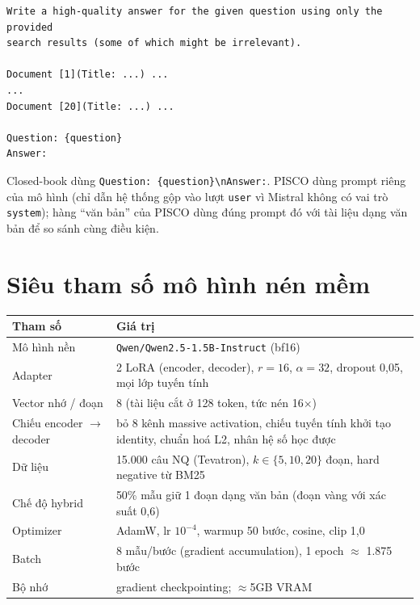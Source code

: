 \begin{lstlisting}
Write a high-quality answer for the given question using only the provided
search results (some of which might be irrelevant).

Document [1](Title: ...) ...
...
Document [20](Title: ...) ...

Question: {question}
Answer:
\end{lstlisting}

Closed-book dùng \texttt{Question: \{question\}\textbackslash nAnswer:}. PISCO dùng prompt riêng của
mô hình (chỉ dẫn hệ thống gộp vào lượt \texttt{user} vì Mistral không có vai trò \texttt{system});
hàng ``văn bản'' của PISCO dùng đúng prompt đó với tài liệu dạng văn bản để so sánh cùng điều kiện.

\clearpage
\section{Siêu tham số mô hình nén mềm}
\label{app:soft-hparams}

\noindent\begin{minipage}{\linewidth}
\centering
{}
\label{tab:soft-hparams}
\small
\begin{tabularx}{\linewidth}{l X}
\toprule
Tham số & Giá trị \\
\midrule
Mô hình nền & \nolinkurl{Qwen/Qwen2.5-1.5B-Instruct} (bf16) \\
Adapter & 2 LoRA (encoder, decoder), $r=16$, $\alpha=32$, dropout 0,05, mọi lớp tuyến tính \\
Vector nhớ / đoạn & 8 (tài liệu cắt ở 128 token, tức nén 16$\times$) \\
Chiếu encoder $\to$ decoder & bỏ 8 kênh massive activation, chiếu tuyến tính khởi tạo identity,
  chuẩn hoá L2, nhân hệ số học được \\
Dữ liệu & 15.000 câu NQ (Tevatron), $k\in\{5,10,20\}$ đoạn, hard negative từ BM25 \\
Chế độ hybrid & 50\% mẫu giữ 1 đoạn dạng văn bản (đoạn vàng với xác suất 0,6) \\
Optimizer & AdamW, lr $10^{-4}$, warmup 50 bước, cosine, clip 1,0 \\
Batch & 8 mẫu/bước (gradient accumulation), 1 epoch $\approx$ 1.875 bước \\
Bộ nhớ & gradient checkpointing; $\approx$5GB VRAM \\
\bottomrule
\end{tabularx}
\end{minipage}
